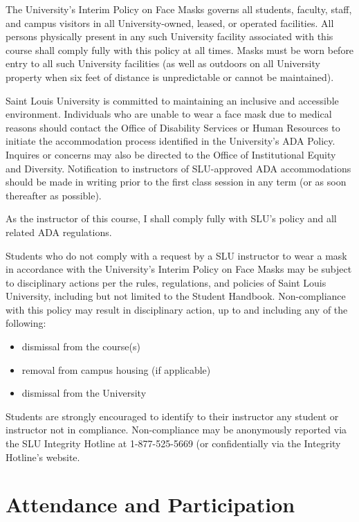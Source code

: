 \documentclass[
]{book}
\providecommand{\tightlist}{%
  \setlength{\itemsep}{0pt}\setlength{\parskip}{0pt}}
\begin{document}
The University's Interim Policy on Face Masks governs all students, faculty, staff, and campus visitors in all University-owned, leased, or operated facilities. All persons physically present in any such University facility associated with this course shall comply fully with this policy at all times. Masks must be worn before entry to all such University facilities (as well as outdoors on all University property when six feet of distance is unpredictable or cannot be maintained).

Saint Louis University is committed to maintaining an inclusive and accessible environment. Individuals who are unable to wear a face mask due to medical reasons should contact the Office of Disability Services or Human Resources to initiate the accommodation process identified in the University's ADA Policy. Inquires or concerns may also be directed to the Office of Institutional Equity and Diversity. Notification to instructors of SLU-approved ADA accommodations should be made in writing prior to the first class session in any term (or as soon thereafter as possible).

As the instructor of this course, I shall comply fully with SLU's policy and all related ADA regulations.

Students who do not comply with a request by a SLU instructor to wear a mask in accordance with the University's Interim Policy on Face Masks may be subject to disciplinary actions per the rules, regulations, and policies of Saint Louis University, including but not limited to the Student Handbook. Non-compliance with this policy may result in disciplinary action, up to and including any of the following:

\begin{itemize}
\tightlist
\item
  dismissal from the course(s)
\item
  removal from campus housing (if applicable)
\item
  dismissal from the University
\end{itemize}

Students are strongly encouraged to identify to their instructor any student or instructor not in compliance. Non-compliance may be anonymously reported via the SLU Integrity Hotline at 1-877-525-5669 (or confidentially via the Integrity Hotline's website.

\hypertarget{attendance-and-participation}{%
\section{Attendance and Participation}\label{attendance-and-participation}}
\end{document}
